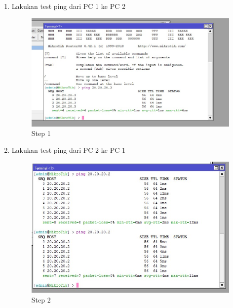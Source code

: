 \begin{enumerate}
	\item Lakukan test ping dari PC 1 ke PC 2
	\begin{figure}[H]
		\centering
		\includegraphics[width=0.5\linewidth]{P1/img/hasilper2pc1.jpg}
		\caption{Step 1}
		\label{fig:gambar28}
	\end{figure}

	\item Lakukan test ping dari PC 2 ke PC 1
	\begin{figure}[H]
		\centering
		\includegraphics[width=0.5\linewidth]{P1/img/hasilper2pc2.jpg}
		\caption{Step 2}
		\label{fig:gambar29}
	\end{figure}

\end{enumerate}


